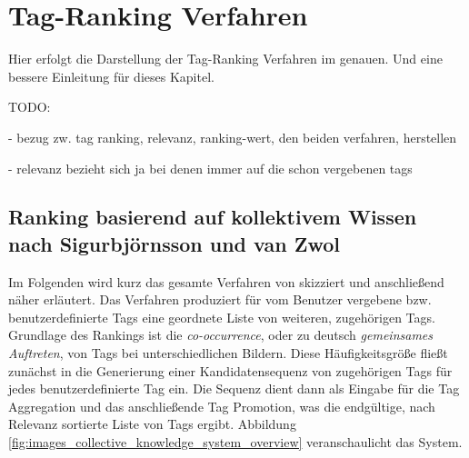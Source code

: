 \section{Tag-Ranking Verfahren} %
\label{sec:tag_ranking_verfahren}
Hier erfolgt die Darstellung der Tag-Ranking Verfahren im genauen. Und eine bessere Einleitung für dieses Kapitel.

TODO:

- bezug zw. {tag ranking, relevanz, ranking-wert, den beiden verfahren}, herstellen

- relevanz bezieht sich ja bei denen immer auf die schon vergebenen tags

% 
% 

\subsection{Ranking basierend auf kollektivem Wissen nach Sigurbjörnsson und van Zwol} %
\label{sub:ranking_basierend_auf_kollektivem_wissen_nach_zwol}

Im Folgenden wird kurz das gesamte Verfahren von \cite{collectiveKnowledge} skizziert und anschließend näher erläutert. Das Verfahren produziert für vom Benutzer vergebene bzw. benutzerdefinierte Tags eine geordnete Liste von weiteren, zugehörigen Tags. Grundlage des Rankings ist die \emph{co-occurrence}, oder zu deutsch \emph{gemeinsames Auftreten}, von Tags bei unterschiedlichen Bildern. Diese Häufigkeitsgröße fließt zunächst in die Generierung einer Kandidatensequenz von zugehörigen Tags für jedes benutzerdefinierte Tag ein. Die Sequenz dient dann als Eingabe für die Tag Aggregation und das anschließende Tag Promotion, was die endgültige, nach Relevanz sortierte Liste von Tags ergibt. Abbildung \ref{fig:images_collective_knowledge_system_overview} veranschaulicht das System.

